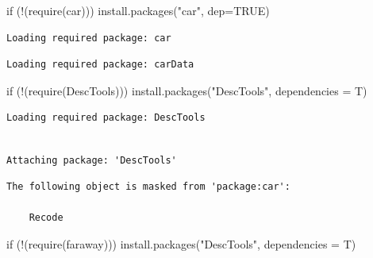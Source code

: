 \documentclass[
  letterpaper,
  DIV=11,
  numbers=noendperiod]{scrartcl}
\newenvironment{Shaded}{\begin{snugshade}}{\end{snugshade}}
\newcommand{\AttributeTok}[1]{\textcolor[rgb]{0.40,0.45,0.13}{#1}}
\newcommand{\ConstantTok}[1]{\textcolor[rgb]{0.56,0.35,0.01}{#1}}
\newcommand{\ControlFlowTok}[1]{\textcolor[rgb]{0.00,0.23,0.31}{#1}}
\newcommand{\FunctionTok}[1]{\textcolor[rgb]{0.28,0.35,0.67}{#1}}
\newcommand{\NormalTok}[1]{\textcolor[rgb]{0.00,0.23,0.31}{#1}}
\newcommand{\SpecialCharTok}[1]{\textcolor[rgb]{0.37,0.37,0.37}{#1}}
\newcommand{\StringTok}[1]{\textcolor[rgb]{0.13,0.47,0.30}{#1}}
\begin{document}
\begin{Shaded}
\begin{Highlighting}[]
\ControlFlowTok{if}\NormalTok{ (}\SpecialCharTok{!}\NormalTok{(}\FunctionTok{require}\NormalTok{(car))) }\FunctionTok{install.packages}\NormalTok{(}\StringTok{"car"}\NormalTok{, }\AttributeTok{dep=}\ConstantTok{TRUE}\NormalTok{)}
\end{Highlighting}
\end{Shaded}

\begin{verbatim}
Loading required package: car
\end{verbatim}

\begin{verbatim}
Loading required package: carData
\end{verbatim}

\begin{Shaded}
\begin{Highlighting}[]
\ControlFlowTok{if}\NormalTok{ (}\SpecialCharTok{!}\NormalTok{(}\FunctionTok{require}\NormalTok{(DescTools))) }\FunctionTok{install.packages}\NormalTok{(}\StringTok{"DescTools"}\NormalTok{,}
                                            \AttributeTok{dependencies =}\NormalTok{ T)}
\end{Highlighting}
\end{Shaded}

\begin{verbatim}
Loading required package: DescTools
\end{verbatim}

\begin{verbatim}

Attaching package: 'DescTools'
\end{verbatim}

\begin{verbatim}
The following object is masked from 'package:car':

    Recode
\end{verbatim}

\begin{Shaded}
\begin{Highlighting}[]
\ControlFlowTok{if}\NormalTok{ (}\SpecialCharTok{!}\NormalTok{(}\FunctionTok{require}\NormalTok{(faraway))) }\FunctionTok{install.packages}\NormalTok{(}\StringTok{"DescTools"}\NormalTok{,}
                                            \AttributeTok{dependencies =}\NormalTok{ T)}
\end{Highlighting}
\end{Shaded}
\end{document}
